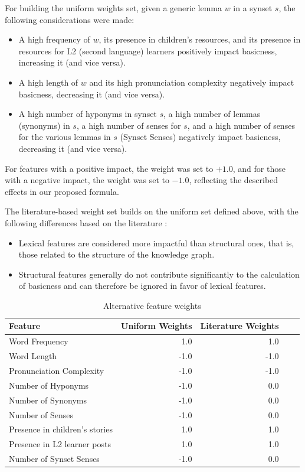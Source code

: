 \documentclass[preprint,12pt,authoryear]{elsarticle}
\begin{document}
For building the uniform weights set, given a generic lemma $w$ in a synset $s$, the following considerations were made:

\begin{itemize}
    \item A high frequency of $w$, its presence in children's resources, and its presence in resources for L2 (second language) learners positively impact basicness, increasing it (and vice versa).
    \item A high length of $w$ and its high pronunciation complexity negatively impact basicness, decreasing it (and vice versa).
    \item A high number of hyponyms in synset $s$, a high number of lemmas (synonyms) in $s$, a high number of senses for $s$, and a high number of senses for the various lemmas in $s$ (Synset Senses) negatively impact basicness, decreasing it (and vice versa).
\end{itemize}

For features with a positive impact, the weight was set to $+1.0$, and for those with a negative impact, the weight was set to $-1.0$, reflecting the described effects in our proposed formula.

The literature-based weight set builds on the uniform set defined above, with the following differences based on the literature \cite{hollink_predicting_2020}:

\begin{itemize}
    \item Lexical features are considered more impactful than structural ones, that is, those related to the structure of the knowledge graph.
    \item Structural features generally do not contribute significantly to the calculation of basicness and can therefore be ignored in favor of lexical features.
\end{itemize}

\begin{table}[ht]
	\centering
	\caption{Alternative feature weights}
	\label{tab:feature_weights_bad}
	\begin{tabular}{@{}l r r r r@{}}
		\toprule
		\textbf{Feature}               & \textbf{Uniform Weights} & \textbf{Literature Weights} \\ 
		\midrule
		Word Frequency                 & 1.0 & 1.0 \\
		Word Length                    & -1.0 & -1.0 \\
		Pronunciation Complexity       & -1.0 & -1.0 \\
		\midrule
		Number of Hyponyms             & -1.0 & 0.0 \\
		Number of Synonyms             & -1.0 & 0.0 \\
		Number of Senses               & -1.0 & 0.0 \\
		\midrule
		Presence in children's stories & 1.0 & 1.0 \\
		Presence in L2 learner posts   & 1.0 & 1.0 \\
		\midrule
		Number of Synset Senses        & -1.0 & 0.0 \\
		\bottomrule
	\end{tabular}
	\smallskip
\end{table}
\end{document}
